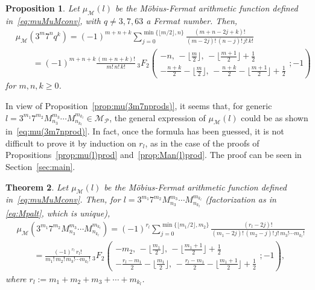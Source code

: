 \documentclass[11pt, a4paper]{article}
\newcommand{\calM}{\mathcal{M}}
\newcommand{\muM}{\mu_\calM}
\newcommand{\Mp}{\calM_{\mathcal{P}}}
\theoremstyle{plain}
\newtheorem{theorem}{Theorem}
\newtheorem{proposition}[theorem]{Proposition}
\theoremstyle{definition}
\begin{document}
\begin{proposition}
\label{prop:mu(3m7nqk)}
Let $\muM(l)$ be the M\"obius-Fermat arithmetic function defined in~\eqref{eq:muMuMconv}, with $q\ne3,7,63$ a Fermat number.
Then, 
\begin{align}
\label{eq:mu(3m7nqk)}
  &\muM(3^m7^nq^k) =
  (-1)^{m+n+k} \sum_{j=0}^{\min\{\lfloor m/2\rfloor, n\}} 
  \frac{(m+n-2j+k)!}{(m-2j)!\,(n-j)!\,j!\,k!} \\
  \nonumber
  &\qquad = (-1)^{m+n+k} \frac{(m+n+k)!}{m!\,n!\,k!}\,
  {}_3F_2 \! \left(\begin{matrix}
  -n,\, -\lfloor\tfrac{m}{2}\rfloor,\, -\lfloor\tfrac{m+1}{2}\rfloor + \tfrac{1}{2} \\[4pt]
  -\tfrac{n+k}{2} - \lfloor\tfrac{m}{2}\rfloor,\, -\tfrac{n+k}{2} - \lfloor\tfrac{m+1}{2}\rfloor + \tfrac{1}{2}
  \end{matrix}; -1 \right)
\end{align}
for $m,n,k\ge0$. 
\end{proposition}

In view of Proposition~\ref{prop:mu(3m7nprods)}, it seems that, for generic $l = 3^{m_1} 7^{m_2} M_{n_3}^{m_3} \cdots M_{n_{k_l}}^{m_{k_l}} \in \Mp$, the general expression of $\muM(l)$ could be as shown in~\eqref{eq:mu(3m7nprod)}.
In fact, once the formula has been guessed, it is not difficult to prove it by induction on $r_l$, as in the case of the proofs of Propositions~\ref{prop:mu(l)prod} and~\ref{prop:Man(l)prod}. The proof can be seen in Section~\ref{sec:main}.

\begin{theorem}
\label{teo:mu(3m7nprod)}
Let $\muM(l)$ be the M\"obius-Fermat arithmetic function defined in~\eqref{eq:muMuMconv}. 
Then, for $l = 3^{m_1} 7^{m_2} M_{n_3}^{m_3} \cdots M_{n_{k_l}}^{m_{k_l}}$ (factorization as in \eqref{eq:Mpalt}, which is unique),
\begin{align}
\label{eq:mu(3m7nprod)}
  &\muM(3^{m_1} 7^{m_2} M_{n_3}^{m_3} \cdots M_{n_{k_l}}^{m_{k_l}}) 
  = (-1)^{r_l} \sum_{j=0}^{\min\{\lfloor m_1/2\rfloor, m_2\}} 
  \frac{(r_l-2j)!}{(m_1-2j)!\,(m_2-j)!\,j!\,m_3! \cdots m_{k_l}!} \\
\nonumber
  &\qquad= \frac{(-1)^{r_l}\, r_l!}{m_1!\,m_2!\,m_3!\cdots m_{k_l}!}\,
  {}_3F_2 \! \left(\begin{matrix}
  -m_2,\, -\lfloor\tfrac{m_1}{2}\rfloor,\, -\lfloor\tfrac{m_1+1}{2}\rfloor + \tfrac{1}{2} \\[4pt]
  -\tfrac{r_l-m_1}{2} - \lfloor\tfrac{m_1}{2}\rfloor,\, -\tfrac{r_l-m_1}{2} - \lfloor\tfrac{m_1+1}{2}\rfloor + \tfrac{1}{2}
  \end{matrix}; -1 \right),
\end{align}
where $r_l := m_1 + m_2 + m_3 + \cdots + m_{k_l}$. 
\end{theorem}
\end{document}
